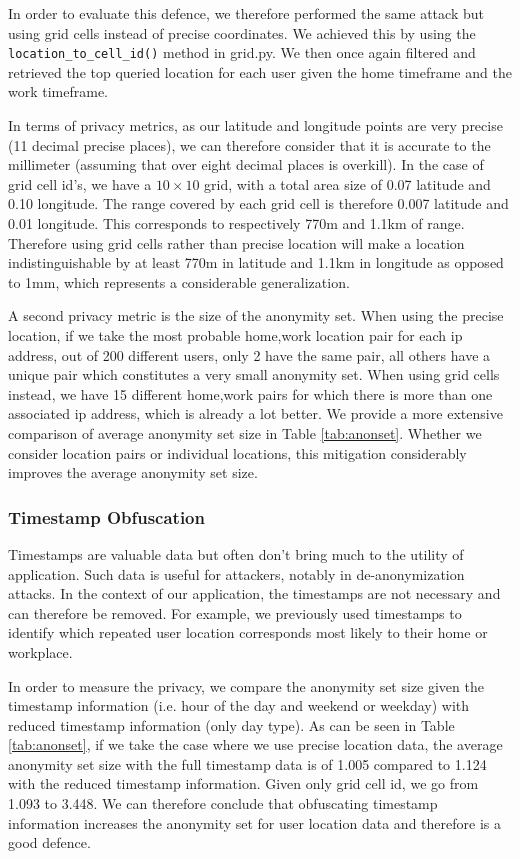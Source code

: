 \documentclass[10pt,conference,compsocconf]{IEEEtran}
\begin{document}
In order to evaluate this defence, we therefore performed the same attack but using grid cells instead of precise coordinates. We achieved this by using the \texttt{location\_to\_cell\_id()} method in grid.py. We then once again filtered and retrieved the top queried location for each user given the home timeframe and the work timeframe. 

In terms of privacy metrics, as our latitude and longitude points are very precise (11 decimal precise places), we can therefore consider that it is accurate to the millimeter (assuming that over eight decimal places is overkill). In the case of grid cell id's, we have a $10\times10$ grid, with a total area size of 0.07 latitude and 0.10 longitude. The range covered by each grid cell is therefore 0.007 latitude and 0.01 longitude. This corresponds to respectively 770m and 1.1km of range. Therefore using grid cells rather than precise location will make a location indistinguishable by at least 770m in latitude and 1.1km in longitude as opposed to 1mm, which represents a considerable generalization.

A second privacy metric is the size of the anonymity set. When using the precise location, if we take the most probable home,work location pair for each ip address, out of 200 different users, only 2 have the same pair, all others have a unique pair which constitutes a very small anonymity set. When using grid cells instead, we have 15 different home,work pairs for which there is more than one associated ip address, which is already a lot better. We provide a more extensive comparison of average anonymity set size in Table \ref{tab:anonset}. Whether we consider location pairs or individual locations, this mitigation considerably improves the average anonymity set size.

\subsubsection{Timestamp Obfuscation}
Timestamps are valuable data but often don't bring much to the utility of application. Such data is useful for attackers, notably in de-anonymization attacks. In the context of our application, the timestamps are not necessary and can therefore be removed. For example, we previously used timestamps to identify which repeated user location corresponds most likely to their home or workplace. 

In order to measure the privacy, we compare the anonymity set size given the timestamp information (i.e. hour of the day and weekend or weekday) with reduced timestamp information (only day type). As can be seen in Table \ref{tab:anonset}, if we take the case where we use precise location data, the average anonymity set size with the full timestamp data is of 1.005 compared to 1.124 with the reduced timestamp information. Given only grid cell id, we go from 1.093 to 3.448. We can therefore conclude that obfuscating timestamp information increases the anonymity set for user location data and therefore is a good defence. 
\end{document}

